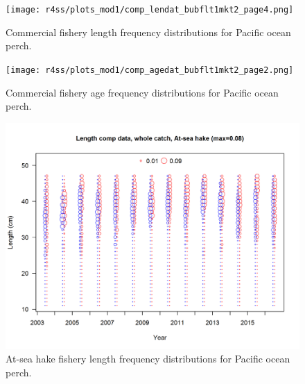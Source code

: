\documentclass[12pt,]{article}
\begin{document}
\FloatBarrier

\begin{figure}
\centering
\texttt{[image: r4ss/plots\_mod1/comp\_lendat\_bubflt1mkt2\_page4.png]}
\caption{Commercial fishery length frequency distributions for Pacific
ocean perch. \label{fig:Comm_Length}}
\end{figure}

\FloatBarrier

\begin{figure}
\centering
\texttt{[image: r4ss/plots\_mod1/comp\_agedat\_bubflt1mkt2\_page2.png]}
\caption{Commercial fishery age frequency distributions for Pacific
ocean perch. \label{fig:Comm_Age}}
\end{figure}

\FloatBarrier

\begin{figure}
\centering
\includegraphics{r4ss/plots_mod1/comp_lendat_bubflt2mkt0.png}
\caption{At-sea hake fishery length frequency distributions for Pacific
ocean perch. \label{fig:ASHOP_Length}}
\end{figure}

\FloatBarrier
\end{document}

